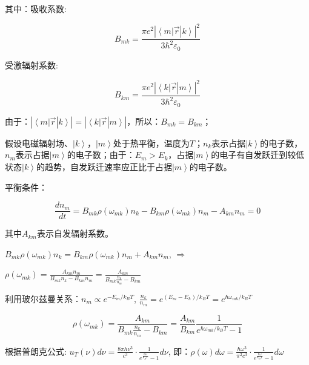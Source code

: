 其中：吸收系数:

\begin{equation}\label{25-14}
B_{mk}  = \frac{{\pi e^2 | \left\langle m \right|\left. {\vec r}
\right|\left. k \right\rangle |^2 }}{{3\hbar ^2 \varepsilon _0 }}
\end{equation}

受激辐射系数:

\begin{equation}\label{25-15}
B_{km}  = \frac{{\pi e^2 | \left\langle k \right|\left. {\vec r}
\right|\left. m \right\rangle |^2 }}{{3\hbar ^2 \varepsilon _0 }}
\end{equation}

由于：$| \left\langle m \right|\left. {\vec r} \right|\left. k
\right\rangle | = | \left\langle k \right|\left. {\vec r}
\right|\left. m \right\rangle |$，所以：$B_{mk}  = B_{km} $；


假设电磁辐射场、$\left| k \right\rangle $，$\left| m \right\rangle $处于热平衡，温度为$T$；$n_k$表示占据$\left| k \right\rangle $的电子数，$n_m$表示占据$\left| m \right\rangle $的电子数；由于：$E_m  > E_k $，占据$\left| m \right\rangle $的电子有自发跃迁到较低状态$\left| k \right\rangle $的趋势，自发跃迁速率应正比于占据$\left| m \right\rangle $的电子数。

平衡条件：

\begin{equation}\label{25-16}
\frac{{dn_m }}{{dt}} = B_{mk} \rho (\omega _{mk} )n_k  - B_{km} \rho (\omega _{mk} )n_m  - A_{km} n_m  = 0
\end{equation}

其中$A_{km}$表示自发辐射系数。

$B_{mk} \rho (\omega _{mk} )n_k  = B_{km} \rho (\omega _{mk} )n_m  + A_{km} n_m $, $ \Rightarrow $


$\rho (\omega _{mk} ) = \frac{{A_{km} n_m }}{{B_{mk} n_k  - B_{km} n_m }} = \frac{{A_{km} }}{{B_{mk} \frac{{n_k }}{{n_m }} - B_{km} }}$


利用玻尔兹曼关系：$n_m  \propto e^{ - E_m /k_B T} $, $\frac{{n_k }}{{n_m }} = e^{(E_m  - E_k )/k_B T}  = e^{\hbar \omega _{mk} /k_B T} $

\begin{equation}\label{25-17}
\rho (\omega _{mk} ) = \frac{{A_{km} }}{{B_{mk} \frac{{n_k }}{{n_m }} - B_{km} }} = \frac{{A_{km} }}{{B_{km} }}\frac{1}{{e^{\hbar \omega _{mk} /k_B T}  - 1}}
\end{equation}

根据普朗克公式: $u_T (\nu )d\nu  = \frac{{8\pi h\nu ^3 }}{{c^3 }}
\cdot \frac{1}{{e^{\frac{{h\nu }}{{k_B T}}}  - 1}}d\nu $, 即：$\rho
(\omega )d\omega  = \frac{{\hbar \omega ^3 }}{{\pi ^2 c^3 }} \cdot
\frac{1}{{e^{\frac{{\hbar \omega }}{{k_B T}}}  - 1}}d\omega $

